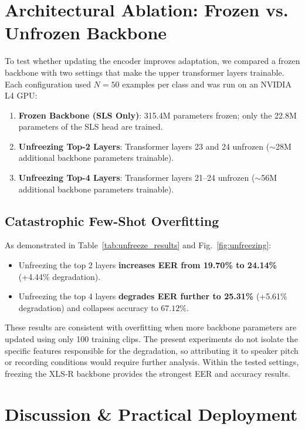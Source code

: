 \documentclass[conference]{IEEEtran}
\begin{document}
\section{Architectural Ablation: Frozen vs. Unfrozen Backbone}

To test whether updating the encoder improves adaptation, we compared a frozen backbone with two settings that make the upper transformer layers trainable. Each configuration used $N=50$ examples per class and was run on an NVIDIA L4 GPU:

\begin{enumerate}
    \item \textbf{Frozen Backbone (SLS Only)}: 315.4M parameters frozen; only the 22.8M parameters of the SLS head are trained.
    \item \textbf{Unfreezing Top-2 Layers}: Transformer layers 23 and 24 unfrozen ($\sim$28M additional backbone parameters trainable).
    \item \textbf{Unfreezing Top-4 Layers}: Transformer layers 21--24 unfrozen ($\sim$56M additional backbone parameters trainable).
\end{enumerate}

\subsection{Catastrophic Few-Shot Overfitting}

As demonstrated in Table~\ref{tab:unfreeze_results} and Fig.~\ref{fig:unfreezing}:

\begin{itemize}
    \item Unfreezing the top 2 layers \textbf{increases EER from 19.70\% to 24.14\%} (+4.44\% degradation).
    \item Unfreezing the top 4 layers \textbf{degrades EER further to 25.31\%} (+5.61\% degradation) and collapses accuracy to $67.12\%$.
\end{itemize}

These results are consistent with overfitting when more backbone parameters are updated using only 100 training clips. The present experiments do not isolate the specific features responsible for the degradation, so attributing it to speaker pitch or recording conditions would require further analysis. Within the tested settings, freezing the XLS-R backbone provides the strongest EER and accuracy results.

\section{Discussion \& Practical Deployment}
\end{document}
